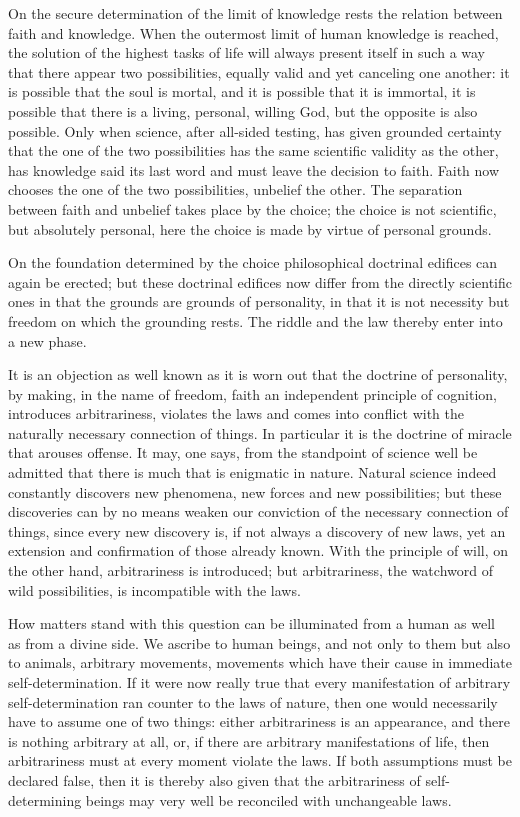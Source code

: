\documentclass[12pt,a4paper,openany]{book}
\newcommand{\opage}[1]{\marginnote{\footnotesize\textit{[#1]}}}
\begin{document}
On the secure determination of the limit of knowledge
rests the relation between faith and knowledge. When the outermost
limit of human knowledge is reached, the solution
of the highest tasks of life will always present itself in such a way
that there appear two possibilities, equally valid and yet canceling
one another: it is possible that the soul
is mortal, and it is possible that it is immortal, it is
possible that there is a living, personal, willing God,
but the opposite is also possible. Only when science,
after all-sided testing, has given grounded
certainty that the one of the two possibilities has the same
scientific validity as the other, has knowledge said
its last word and must leave the decision to faith.
Faith now chooses the one of the two possibilities, unbelief
the other. The separation between faith and unbelief
takes place by the choice; the choice is not scientific, but
absolutely personal, here the choice is made by virtue of personal
grounds.

\setcounter{footnote}{0}%
\opage{401}On the foundation determined by the choice philosophical
doctrinal edifices can again be erected; but these doctrinal edifices
now differ from the directly scientific ones
in that the grounds are grounds of personality, in that it
is not necessity but freedom on which the grounding
rests. The riddle and the law thereby enter
into a new phase.

It is an objection as well known as it is worn out
that the doctrine of personality, by making, in the name of freedom,
faith an independent principle of cognition, introduces arbitrariness,
violates the laws and comes into conflict
with the naturally necessary connection of things. In particular
it is the doctrine of miracle that arouses offense. It
may, one says, from the standpoint of science well be admitted
that there is much that is enigmatic in nature. Natural science
indeed constantly discovers new phenomena, new
forces and new possibilities; but these discoveries can
by no means weaken our conviction of the necessary connection
of things, since every new discovery is, if
not always a discovery of new laws, yet an extension
and confirmation of those already known. With
the principle of will, on the other hand, arbitrariness is introduced; but
arbitrariness, the watchword of wild possibilities, is incompatible
with the laws.

How matters stand with this question can be
illuminated from a human as well as from a divine
side. We ascribe to human beings, and not only to them
but also to animals, arbitrary movements, movements
which have their cause in immediate self-determination.
If it were now really true that every manifestation of
arbitrary self-determination ran counter to the laws of nature, then
\setcounter{footnote}{0}%
\opage{402}one would necessarily have to assume one of two things: either arbitrariness
is an appearance, and there is nothing arbitrary at all,
or, if there are arbitrary manifestations of life, then
arbitrariness must at every moment violate the laws.
If both assumptions must be declared false, then it is
thereby also given that the arbitrariness of self-determining beings
may very well be reconciled with unchangeable
laws.
\end{document}
